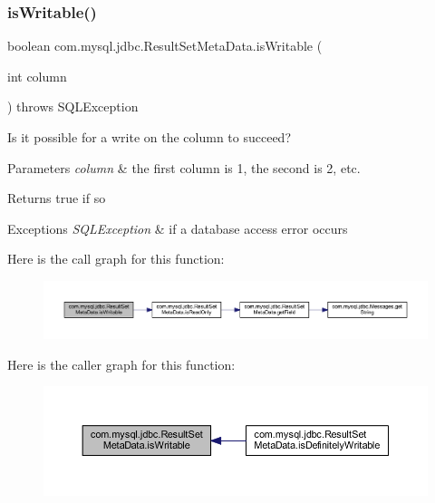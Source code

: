 \subsubsection{\texorpdfstring{is\+Writable()}{isWritable()}}
{\footnotesize\ttfamily boolean com.\+mysql.\+jdbc.\+Result\+Set\+Meta\+Data.\+is\+Writable (\begin{DoxyParamCaption}\item[{int}]{column }\end{DoxyParamCaption}) throws S\+Q\+L\+Exception}

Is it possible for a write on the column to succeed?


\begin{DoxyParams}{Parameters}
{\em column} & the first column is 1, the second is 2, etc.\\
\hline
\end{DoxyParams}
\begin{DoxyReturn}{Returns}
true if so
\end{DoxyReturn}

\begin{DoxyExceptions}{Exceptions}
{\em S\+Q\+L\+Exception} & if a database access error occurs \\
\hline
\end{DoxyExceptions}
Here is the call graph for this function\+:
\nopagebreak
\begin{figure}[H]
\begin{center}
\leavevmode
\includegraphics[width=350pt]{classcom_1_1mysql_1_1jdbc_1_1_result_set_meta_data_aed2b92b641e72e924cbb58197487ced1_cgraph}
\end{center}
\end{figure}
Here is the caller graph for this function\+:
\nopagebreak
\begin{figure}[H]
\begin{center}
\leavevmode
\includegraphics[width=350pt]{classcom_1_1mysql_1_1jdbc_1_1_result_set_meta_data_aed2b92b641e72e924cbb58197487ced1_icgraph}
\end{center}
\end{figure}
\mbox{\label{classcom_1_1mysql_1_1jdbc_1_1_result_set_meta_data_a4150d0a2d0c19586a87567890fb94253}} 

